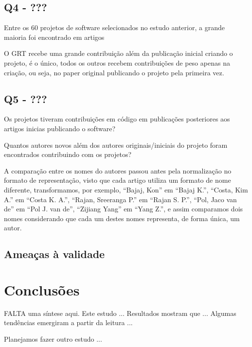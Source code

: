 \subsection{Q4 - ???}

Entre os 60 projetos de software selecionados no estudo anterior, a grande maioria
foi encontrado em artigos 

O GRT recebe uma grande contribuição além da publicação inicial criando o projeto,
é o único, todos os outros recebem contribuições de peso apenas na criação, ou seja,
no paper original publicando o projeto pela primeira vez.

\subsection{Q5 - ???}

Os projetos tiveram contribuições em código em publicações posteriores aos
artigos inicias publicando o software?

Quantos autores novos além dos autores originais/iniciais do projeto
foram encontrados contribuindo com os projetos?

%

A comparação entre os nomes do autores passou antes pela normalização
no formato de representação, visto que cada artigo utiliza um formato
de nome diferente, transformamos, por exemplo, ``Bajaj, Kon'' em ``Bajaj K.'',
``Costa, Kim A.'' em ``Costa K. A.'', ``Rajan, Sreeranga P.'' em ``Rajan S. P.'',
``Pol, Jaco van de'' em ``Pol J. van de'', ``Zijiang Yang'' em ``Yang Z.'',
e assim comparamos dois nomes considerando que cada um destes nomes representa,
de forma única, um autor.

\subsection{Ameaças à validade}

\section{Conclusões}

FALTA uma síntese aqui. 
Este estudo ...
Resultados mostram que ...
Algumas tendências emergiram a partir da leitura ...

Planejamos fazer outro estudo ... 



